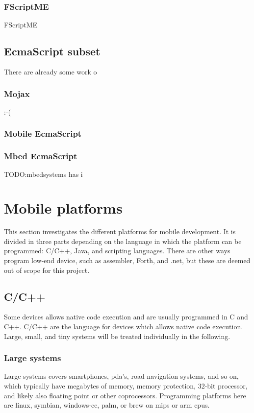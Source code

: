 \subsubsection{FScriptME}
FScriptME

\subsection{EcmaScript subset}
There are already some work o
\subsubsection{Mojax}
:-(
\subsubsection{Mobile EcmaScript}
\subsubsection{Mbed EcmaScript}
TODO:mbedsystems has i

\section{Mobile platforms}

This section investigates the different platforms for mobile development. 
It is divided in three parts depending on the language in which the platform can be programmed:
C/C++, Java, and scripting languages.
There are other ways program low-end device, such as assembler, Forth, and .net, but these are deemed out of scope for this project.


\subsection{C/C++}
Some devices allows native code execution and are usually programmed in C and C++.
C/C++ are the language for devices which allows native code execution.
Large, small, and tiny systems will be treated individually in the following.

\subsubsection{Large systems}
Large systems covers smartphones, pda's, road navigation systems, and so on, which typically have megabytes of memory, memory protection, 32-bit processor, and likely also floating point or other coprocessors. Programming platforms here are linux, symbian, windows-ce, palm, or brew on mips or arm cpus. 

